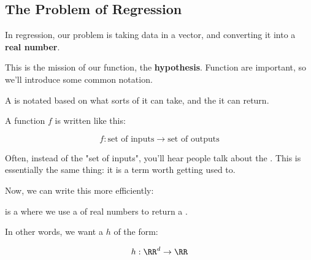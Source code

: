     \subsection{The Problem of Regression}
    
        In regression, our problem is taking data in a vector, and converting it into a \textbf{real number}. 
        
        This is the mission of our function, the \textbf{hypothesis}. Function are important, so we'll introduce some common notation.\\
        
        \begin{notation}
            A  is notated based on what sorts of  it can take, and the  it can return. 
            
            A function $f$ is written like this:
            
            \begin{equation*}
                f: \text{set of inputs} \rightarrow \text{set of outputs}
            \end{equation*}
        \end{notation}
        
        Often, instead of the "set of inputs", you'll hear people talk about the . This is essentially the same thing: it is a term worth getting used to.
        
        Now, we can write this more efficiently:\\
        
        \begin{definition}
             is a  where we use a  of real numbers to return a .
            
            In other words, we want a  $h$ of the form:
            
            \begin{equation*}
                h: \RR^d \rightarrow \RR
            \end{equation*}
            
        \end{definition}
        
